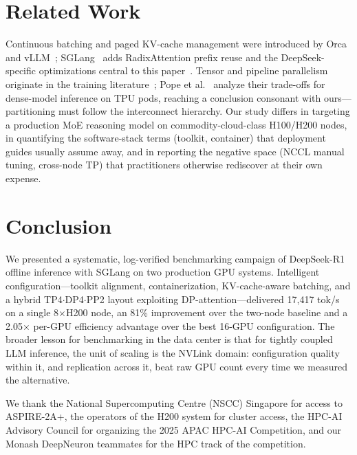 \documentclass[sigconf]{acmart}
\begin{document}
\section{Related Work}
Continuous batching and paged KV-cache management were introduced by Orca~\cite{yu2022orca} and vLLM~\cite{kwon2023vllm}; SGLang~\cite{zheng2024sglang} adds RadixAttention prefix reuse and the DeepSeek-specific optimizations central to this paper~\cite{sglangv04blog}. Tensor and pipeline parallelism originate in the training literature~\cite{shoeybi2019megatron,huang2019gpipe,narayanan2021efficient}; Pope et al.~\cite{pope2023efficiently} analyze their trade-offs for dense-model inference on TPU pods, reaching a conclusion consonant with ours---partitioning must follow the interconnect hierarchy. Our study differs in targeting a production MoE reasoning model on commodity-cloud-class H100/H200 nodes, in quantifying the software-stack terms (toolkit, container) that deployment guides usually assume away, and in reporting the negative space (NCCL manual tuning, cross-node TP) that practitioners otherwise rediscover at their own expense.

\section{Conclusion}
We presented a systematic, log-verified benchmarking campaign of DeepSeek-R1 offline inference with SGLang on two production GPU systems. Intelligent configuration---toolkit alignment, containerization, KV-cache-aware batching, and a hybrid TP4$\cdot$DP4$\cdot$PP2 layout exploiting DP-attention---delivered 17{,}417 tok/s on a single 8$\times$H200 node, an 81\% improvement over the two-node baseline and a 2.05$\times$ per-GPU efficiency advantage over the best 16-GPU configuration. The broader lesson for benchmarking in the data center is that for tightly coupled LLM inference, the unit of scaling is the NVLink domain: configuration quality within it, and replication across it, beat raw GPU count every time we measured the alternative.

\begin{acks}
We thank the National Supercomputing Centre (NSCC) Singapore for access to ASPIRE-2A+, the operators of the H200 system for cluster access, the HPC-AI Advisory Council for organizing the 2025 APAC HPC-AI Competition, and our Monash DeepNeuron teammates for the HPC track of the competition.
\end{acks}



\end{document}
